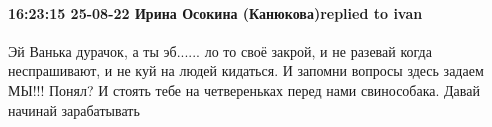  
 
 
 
 

\paragraph{16:23:15 25-08-22 Ирина Осокина (Канюкова)replied to ivan}

Эй Ванька дурачок, а ты эб...... ло то своё закрой, и не разевай когда
неспрашивают, и не куй на людей кидаться. И запомни вопросы здесь задаем МЫ!!!
Понял? И стоять тебе на четвереньках перед нами свинособака. Давай начинай
зарабатывать
